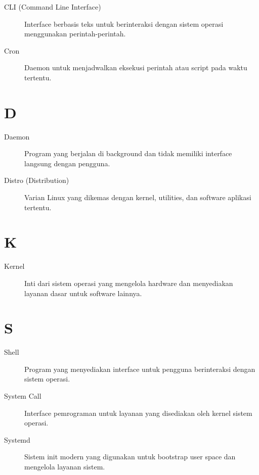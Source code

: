 \begin{description}
    \item[CLI (Command Line Interface)] Interface berbasis teks untuk berinteraksi
          dengan sistem operasi menggunakan perintah-perintah.

    \item[Cron] Daemon untuk menjadwalkan eksekusi perintah atau script pada
          waktu tertentu.
\end{description}

\section*{D}

\begin{description}
    \item[Daemon] Program yang berjalan di background dan tidak memiliki
          interface langsung dengan pengguna.

    \item[Distro (Distribution)] Varian Linux yang dikemas dengan kernel,
          utilities, dan software aplikasi tertentu.
\end{description}


\section*{K}

\begin{description}
    \item[Kernel] Inti dari sistem operasi yang mengelola hardware dan
          menyediakan layanan dasar untuk software lainnya.
\end{description}

\section*{S}

\begin{description}
    \item[Shell] Program yang menyediakan interface untuk pengguna berinteraksi
          dengan sistem operasi.

    \item[System Call] Interface pemrograman untuk layanan yang disediakan
          oleh kernel sistem operasi.

    \item[Systemd] Sistem init modern yang digunakan untuk bootstrap user space
          dan mengelola layanan sistem.
\end{description}

